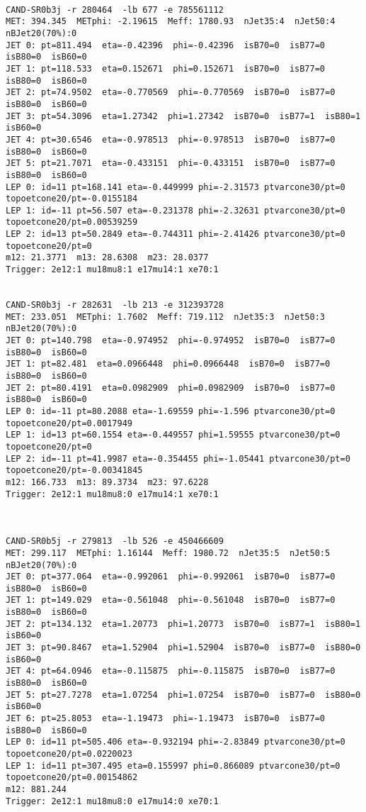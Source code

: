 \begin{footnotesize}
\begin{verbatim}

CAND-SR0b3j -r 280464  -lb 677 -e 785561112 
MET: 394.345  METphi: -2.19615  Meff: 1780.93  nJet35:4  nJet50:4  nBJet20(70%):0  
JET 0: pt=811.494  eta=-0.42396  phi=-0.42396  isB70=0  isB77=0  isB80=0  isB60=0
JET 1: pt=118.533  eta=0.152671  phi=0.152671  isB70=0  isB77=0  isB80=0  isB60=0
JET 2: pt=74.9502  eta=-0.770569  phi=-0.770569  isB70=0  isB77=0  isB80=0  isB60=0
JET 3: pt=54.3096  eta=1.27342  phi=1.27342  isB70=0  isB77=1  isB80=1  isB60=0
JET 4: pt=30.6546  eta=-0.978513  phi=-0.978513  isB70=0  isB77=0  isB80=0  isB60=0
JET 5: pt=21.7071  eta=-0.433151  phi=-0.433151  isB70=0  isB77=0  isB80=0  isB60=0
LEP 0: id=11 pt=168.141 eta=-0.449999 phi=-2.31573 ptvarcone30/pt=0 topoetcone20/pt=-0.0155184
LEP 1: id=-11 pt=56.507 eta=-0.231378 phi=-2.32631 ptvarcone30/pt=0 topoetcone20/pt=0.00539259
LEP 2: id=13 pt=50.2849 eta=-0.744311 phi=-2.41426 ptvarcone30/pt=0 topoetcone20/pt=0
m12: 21.3771  m13: 28.6308  m23: 28.0377
Trigger: 2e12:1 mu18mu8:1 e17mu14:1 xe70:1


CAND-SR0b3j -r 282631  -lb 213 -e 312393728 
MET: 233.051  METphi: 1.7602  Meff: 719.112  nJet35:3  nJet50:3  nBJet20(70%):0  
JET 0: pt=140.798  eta=-0.974952  phi=-0.974952  isB70=0  isB77=0  isB80=0  isB60=0
JET 1: pt=82.481  eta=0.0966448  phi=0.0966448  isB70=0  isB77=0  isB80=0  isB60=0
JET 2: pt=80.4191  eta=0.0982909  phi=0.0982909  isB70=0  isB77=0  isB80=0  isB60=0
LEP 0: id=-11 pt=80.2088 eta=-1.69559 phi=-1.596 ptvarcone30/pt=0 topoetcone20/pt=0.0017949
LEP 1: id=13 pt=60.1554 eta=-0.449557 phi=1.59555 ptvarcone30/pt=0 topoetcone20/pt=0
LEP 2: id=-11 pt=41.9987 eta=-0.354455 phi=-1.05441 ptvarcone30/pt=0 topoetcone20/pt=-0.00341845
m12: 166.733  m13: 89.3734  m23: 97.6228
Trigger: 2e12:1 mu18mu8:0 e17mu14:1 xe70:1



CAND-SR0b5j -r 279813  -lb 526 -e 450466609 
MET: 299.117  METphi: 1.16144  Meff: 1980.72  nJet35:5  nJet50:5  nBJet20(70%):0  
JET 0: pt=377.064  eta=-0.992061  phi=-0.992061  isB70=0  isB77=0  isB80=0  isB60=0
JET 1: pt=149.029  eta=-0.561048  phi=-0.561048  isB70=0  isB77=0  isB80=0  isB60=0
JET 2: pt=134.132  eta=1.20773  phi=1.20773  isB70=0  isB77=1  isB80=1  isB60=0
JET 3: pt=90.8467  eta=1.52904  phi=1.52904  isB70=0  isB77=0  isB80=0  isB60=0
JET 4: pt=64.0946  eta=-0.115875  phi=-0.115875  isB70=0  isB77=0  isB80=0  isB60=0
JET 5: pt=27.7278  eta=1.07254  phi=1.07254  isB70=0  isB77=0  isB80=0  isB60=0
JET 6: pt=25.8053  eta=-1.19473  phi=-1.19473  isB70=0  isB77=0  isB80=0  isB60=0
LEP 0: id=11 pt=505.406 eta=-0.932194 phi=-2.83849 ptvarcone30/pt=0 topoetcone20/pt=0.0220023
LEP 1: id=11 pt=307.495 eta=0.155997 phi=0.866089 ptvarcone30/pt=0 topoetcone20/pt=0.00154862
m12: 881.244
Trigger: 2e12:1 mu18mu8:0 e17mu14:0 xe70:1


\end{verbatim}
\end{footnotesize}

